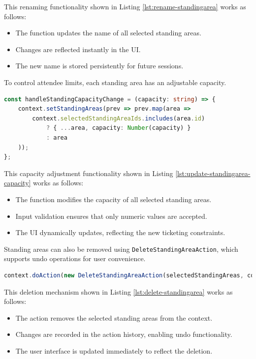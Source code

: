 This renaming functionality shown in Listing \ref{lst:rename-standingarea} works as follows:
\begin{itemize}
    \item The function updates the name of all selected standing areas.
    \item Changes are reflected instantly in the UI.
    \item The new name is stored persistently for future sessions.
\end{itemize}
To control attendee limits, each standing area has an adjustable capacity.

\begin{lstlisting}[language=TypeScript, caption=Updating Standing Area Capacity, label=lst:update-standingarea-capacity]
const handleStandingCapacityChange = (capacity: string) => {
    context.setStandingAreas(prev => prev.map(area =>
        context.selectedStandingAreaIds.includes(area.id)
            ? { ...area, capacity: Number(capacity) }
            : area
    ));
};
\end{lstlisting}

This capacity adjustment functionality shown in Listing \ref{lst:update-standingarea-capacity} works as follows:
\begin{itemize}
    \item The function modifies the capacity of all selected standing areas.
    \item Input validation ensures that only numeric values are accepted.
    \item The UI dynamically updates, reflecting the new ticketing constraints.
\end{itemize}

Standing areas can also be removed using \texttt{DeleteStandingAreaAction}, which supports undo operations for user convenience.

\begin{lstlisting}[language=TypeScript, caption=Deleting Standing Areas, label=lst:delete-standingarea]
context.doAction(new DeleteStandingAreaAction(selectedStandingAreas, context))
\end{lstlisting}

This deletion mechanism shown in Listing \ref{lst:delete-standingarea} works as follows:
\begin{itemize}
    \item The action removes the selected standing areas from the context.
    \item Changes are recorded in the action history, enabling undo functionality.
    \item The user interface is updated immediately to reflect the deletion.
\end{itemize}

